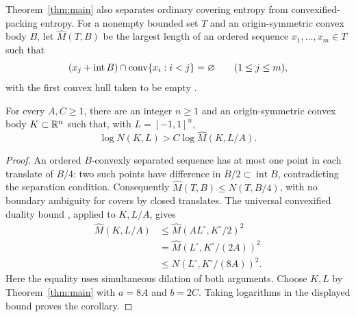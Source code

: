 Theorem~\ref{thm:main} also separates ordinary covering entropy from
convexified-packing entropy. For a nonempty bounded set $T$ and an
origin-symmetric convex body $B$, let $\widehat M(T,B)$ be the largest
length of an ordered sequence $x_1,\ldots,x_m\in T$ such that
\[
 (x_j+\operatorname{int}B)\cap\operatorname{conv}\{x_i:i<j\}=\varnothing
 \qquad(1\le j\le m),
\]
with the first convex hull taken to be empty
\cite[Section~2]{AMSTJ2004}.

\begin{corollary}
\label{cor:convexified-separation}
For every $A,C\ge1$, there are an integer $n\ge1$ and an
origin-symmetric convex body $K\subset\mathbb R^n$ such that, with
$L=[-1,1]^n$,
\[
 \log N(K,L)>C\log\widehat M(K,L/A).
\]
\end{corollary}

\begin{proof}
An ordered $B$-convexly separated sequence has at most one point in
each translate of $B/4$: two such points have difference in
$B/2\subset\operatorname{int}B$, contradicting the separation condition.
Consequently $\widehat M(T,B)\le N(T,B/4)$, with no boundary ambiguity
for covers by closed translates. The universal convexified duality
bound \cite[Theorem~2]{AMSTJ2004}, applied to $K,L/A$, gives
\[
\begin{split}
 \widehat M(K,L/A)
 &\le\widehat M(A L^\circ,K^\circ/2)^2\\
 &=\widehat M(L^\circ,K^\circ/(2A))^2\\
 &\le N(L^\circ,K^\circ/(8A))^2.
\end{split}
\]
Here the equality uses simultaneous dilation of both arguments.
Choose $K,L$ by Theorem~\ref{thm:main} with $a=8A$ and $b=2C$.
Taking logarithms in the displayed bound proves the corollary.
\end{proof}
